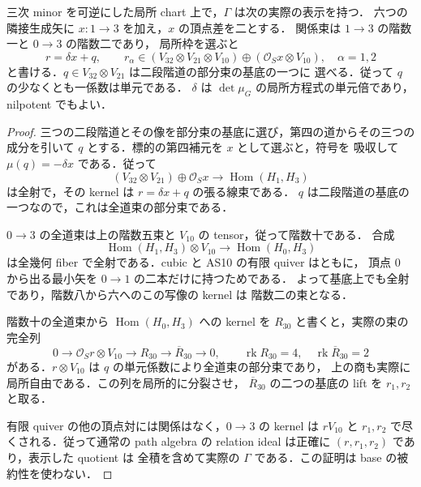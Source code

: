 \begin{lemma}
\label{lem:qa-relative-mutation-seven-three-presentation}
三次 minor を可逆にした局所 chart 上で，$\Gamma$ は次の実際の表示を持つ．
六つの隣接生成矢に $x:1\to3$ を加え，$x$ の頂点差を二とする．
関係束は $1\to3$ の階数一と $0\to3$ の階数二であり，
局所枠を選ぶと
\[
 r=\delta x+q,
 \qquad r_\alpha\in
 (V_{32}\otimes V_{21}\otimes V_{10})
       \oplus (\mathcal O_Sx\otimes V_{10}),\quad \alpha=1,2
 \tag{73}\label{eq:qa-relative-mutation-seven-three}
\]
と書ける．$q\in V_{32}\otimes V_{21}$ は二段階道の部分束の基底の一つに
選べる．従って $q$ の少なくとも一係数は単元である．
$\delta$ は $\det\mu_G$ の局所方程式の単元倍であり，nilpotent でもよい．
\end{lemma}
\begin{proof}
三つの二段階道とその像を部分束の基底に選び，第四の道からその三つの
成分を引いて $q$ とする．標的の第四補元を $x$ として選ぶと，符号を
吸収して $\mu(q)=-\delta x$ である．従って
\[
 (V_{32}\otimes V_{21})\oplus\mathcal O_Sx
       \longrightarrow\operatorname{Hom}(H_1,H_3)
\]
は全射で，その kernel は $r=\delta x+q$ の張る線束である．
$q$ は二段階道の基底の一つなので，これは全道束の部分束である．

$0\to3$ の全道束は上の階数五束と $V_{10}$ の tensor，従って階数十である．
合成
\[
 \operatorname{Hom}(H_1,H_3)\otimes V_{10}
       \longrightarrow\operatorname{Hom}(H_0,H_3)
\]
は全幾何 fiber で全射である．cubic と AS10 の有限 quiver はともに，
頂点 $0$ から出る最小矢を $0\to1$ の二本だけに持つためである．
よって基底上でも全射であり，階数八から六へのこの写像の kernel は
階数二の束となる．

階数十の全道束から $\operatorname{Hom}(H_0,H_3)$ への kernel を $R_{30}$
と書くと，実際の束の完全列
\[
 0\longrightarrow\mathcal O_Sr\otimes V_{10}
       \longrightarrow R_{30}\longrightarrow\overline R_{30}\longrightarrow0,
 \qquad\operatorname{rk}R_{30}=4,\quad
 \operatorname{rk}\overline R_{30}=2
\]
がある．$r\otimes V_{10}$ は $q$ の単元係数により全道束の部分束であり，
上の商も実際に局所自由である．この列を局所的に分裂させ，
$\overline R_{30}$ の二つの基底の lift を $r_1,r_2$ と取る．

有限 quiver の他の頂点対には関係はなく，$0\to3$ の kernel は
$rV_{10}$ と $r_1,r_2$ で尽くされる．従って通常の path algebra の
relation ideal は正確に $(r,r_1,r_2)$ であり，表示した quotient は
全積を含めて実際の $\Gamma$ である．この証明は base の被約性を使わない．
\end{proof}

